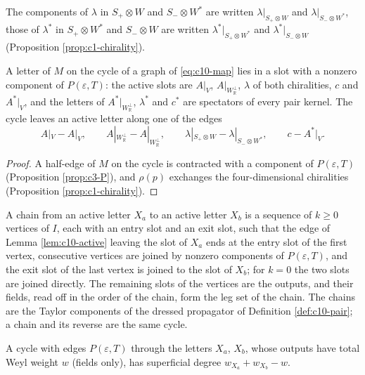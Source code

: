 The components of $\lambda$ in $S_+\otimes W$ and $S_-\otimes W^*$ are written $\lambda|_{S_+\otimes W}$ and $\lambda|_{S_-\otimes W^*}$, those of $\lambda^*$ in $S_+\otimes W^*$ and $S_-\otimes W$ are written $\lambda^*|_{S_+\otimes W^*}$ and $\lambda^*|_{S_-\otimes W}$ (Proposition \ref{prop:c1-chirality}).

\begin{lemma}
\label{lem:c10-active}
A letter of $M$ on the cycle of a graph of \eqref{eq:c10-map} lies in a slot with a nonzero component of $P(\varepsilon,T)$: the active slots are $A|_V$, $A|_{W_{\mathbb R}^\perp}$, $\lambda$ of both chiralities, $c$ and $A^*|_V$, and the letters of $A^*|_{W_{\mathbb R}^\perp}$, $\lambda^*$ and $c^*$ are spectators of every pair kernel. The cycle leaves an active letter along one of the edges
\[
A|_V-A|_V,\qquad A|_{W_{\mathbb R}^\perp}-A|_{W_{\mathbb R}^\perp},\qquad \lambda|_{S_+\otimes W}-\lambda|_{S_-\otimes W^*},\qquad c-A^*|_V .
\]
\end{lemma}

\begin{proof}
A half-edge of $M$ on the cycle is contracted with a component of $P(\varepsilon,T)$ (Proposition \ref{prop:c3-P}), and $\rho(p)$ exchanges the four-dimensional chiralities (Proposition \ref{prop:c1-chirality}).
\end{proof}

\begin{definition}[Chains]
\label{def:c10-chain}
A chain from an active letter $X_a$ to an active letter $X_b$ is a sequence of $k\ge0$ vertices of $I$, each with an entry slot and an exit slot, such that the edge of Lemma \ref{lem:c10-active} leaving the slot of $X_a$ ends at the entry slot of the first vertex, consecutive vertices are joined by nonzero components of $P(\varepsilon,T)$, and the exit slot of the last vertex is joined to the slot of $X_b$; for $k=0$ the two slots are joined directly. The remaining slots of the vertices are the outputs, and their fields, read off in the order of the chain, form the leg set of the chain. The chains are the Taylor components of the dressed propagator of Definition \ref{def:c10-pair}; a chain and its reverse are the same cycle.
\end{definition}

\begin{lemma}
\label{lem:c10-degree}
A cycle with edges $P(\varepsilon,T)$ through the letters $X_a$, $X_b$, whose outputs have total Weyl weight $w$ (fields only), has superficial degree $w_{X_a}+w_{X_b}-w$.
\end{lemma}

